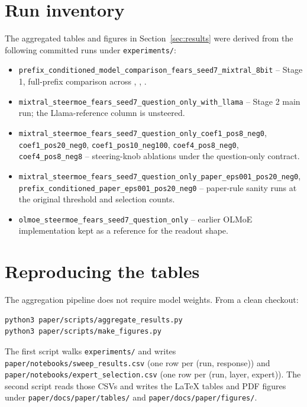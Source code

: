 \appendix
\section{Run inventory}
\label{app:runs}

The aggregated tables and figures in Section~\ref{sec:results} were derived
from the following committed runs under \texttt{experiments/}:

\begin{itemize}
  \item \texttt{prefix\_conditioned\_model\_comparison\_fears\_seed7\_mixtral\_8bit}
  -- Stage 1, full-prefix comparison across \llama, \olmoe, \mixtral.
  \item \texttt{mixtral\_steermoe\_fears\_seed7\_question\_only\_with\_llama}
  -- Stage 2 main run; the Llama-reference column is unsteered.
  \item \texttt{mixtral\_steermoe\_fears\_seed7\_question\_only\_coef1\_pos8\_neg0},
        \texttt{coef1\_pos20\_neg0}, \texttt{coef1\_pos10\_neg100},
        \texttt{coef4\_pos8\_neg0}, \texttt{coef4\_pos8\_neg8} --
        steering-knob ablations under the question-only contract.
  \item \texttt{mixtral\_steermoe\_fears\_seed7\_question\_only\_paper\_eps001\_pos20\_neg0},
        \texttt{prefix\_conditioned\_paper\_eps001\_pos20\_neg0} --
        paper-rule sanity runs at the original threshold and selection counts.
  \item \texttt{olmoe\_steermoe\_fears\_seed7\_question\_only} -- earlier
        OLMoE implementation kept as a reference for the readout shape.
\end{itemize}

\section{Reproducing the tables}
\label{app:repro}

The aggregation pipeline does not require model weights. From a clean
checkout:

\begin{verbatim}
python3 paper/scripts/aggregate_results.py
python3 paper/scripts/make_figures.py
\end{verbatim}

The first script walks \texttt{experiments/} and writes
\texttt{paper/notebooks/sweep\_results.csv} (one row per (run, response))
and \texttt{paper/notebooks/expert\_selection.csv} (one row per
(run, layer, expert)). The second script reads those CSVs and writes the
LaTeX tables and PDF figures under
\texttt{paper/docs/paper/tables/} and \texttt{paper/docs/paper/figures/}.

